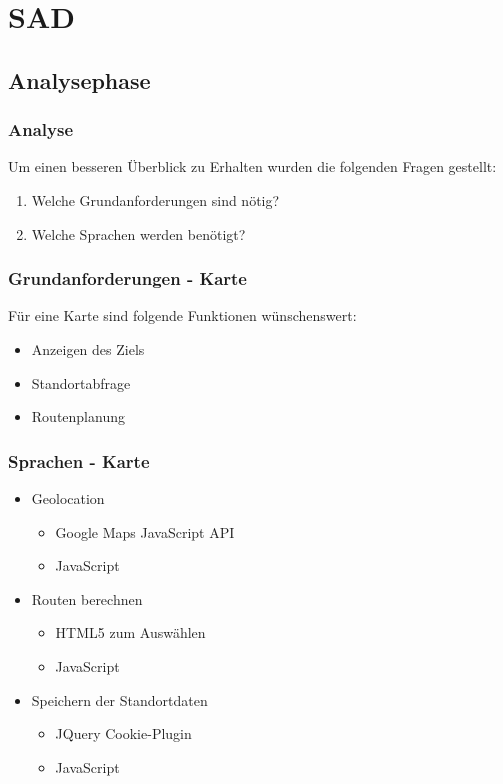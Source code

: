 \section{SAD}
\subsection{Analysephase}
\begin{frame} %
  \frametitle{Analyse} %

  Um einen besseren Überblick zu Erhalten wurden die folgenden Fragen gestellt:
  \begin{enumerate}
   \item Welche Grundanforderungen sind nötig?
   \item Welche Sprachen werden benötigt?
  \end{enumerate}

\end{frame}

\begin{frame} %
  \frametitle{Grundanforderungen - Karte} %

	Für eine Karte sind folgende Funktionen wünschenswert:
   \begin{itemize}
    \item Anzeigen des Ziels
    \item Standortabfrage
    \item Routenplanung
   \end{itemize}

\end{frame}

\begin{frame} %
  \frametitle{Sprachen - Karte} %

   \begin{itemize}
    \item Geolocation
    \begin{itemize}
     \item Google Maps JavaScript API
     \item JavaScript
    \end{itemize}

    \item Routen berechnen
    \begin{itemize}
     \item HTML5 zum Auswählen
     \item JavaScript
    \end{itemize}

    \item Speichern der Standortdaten
    \begin{itemize}
     \item JQuery Cookie-Plugin
     \item JavaScript
    \end{itemize}

    
   \end{itemize}

\end{frame}

